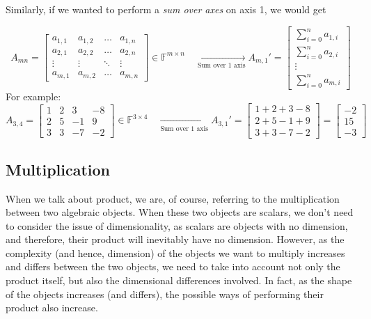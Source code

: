 Similarly, if we wanted to perform a \textit{sum over axes} on axis 1, we would get

$$
A_{mn} = \begin{bmatrix}
    a_{1,1} & a_{1,2} & \dots & a_{1,n} \\
    a_{2,1} & a_{2,2} & \dots & a_{2,n} \\
    \vdots & \vdots & \ddots & \vdots \\
    a_{m,1} & a_{m,2} & \dots & a_{m,n}
\end{bmatrix} \in \mathbb{F}^{m \times n} \quad \underset{\text{Sum over 1 axis}}{\longrightarrow} A_{m, 1}' =
\begin{bmatrix}
    \sum_{i=0}^n a_{1,i} \\
    \sum_{i=0}^n a_{2,i} \\
    \vdots\\
    \sum_{i=0}^n a_{m,i}
\end{bmatrix}
$$
For example:
\[
A_{3,4} = \begin{bmatrix}
    1 & 2 & 3 & -8 \\
    2 & 5 & -1 & 9 \\
    3 & 3 & -7 & -2
\end{bmatrix} \in \mathbb{F}^{3 \times 4} \quad \underset{\text{Sum over 1 axis}}{\longrightarrow} A_{3, 1}' = 
\begin{bmatrix}
    1 + 2 + 3 - 8 \\
    2 + 5 - 1 + 9 \\
    3 + 3 - 7 - 2
\end{bmatrix}
=
\begin{bmatrix}
    -2 \\
    15 \\
    -3
\end{bmatrix}
\]


\subsection{Multiplication}
When we talk about product, we are, of course, referring to the multiplication between two algebraic objects. When these two objects are scalars, we don't need to consider the issue of dimensionality, as scalars are objects with no dimension, and therefore, their product will inevitably have no dimension. However, as the complexity (and hence, dimension) of the objects we want to multiply increases and differs between the two objects, we need to take into account not only the product itself, but also the dimensional differences involved. In fact, as the shape of the objects increases (and differs), the possible ways of performing their product also increase.

